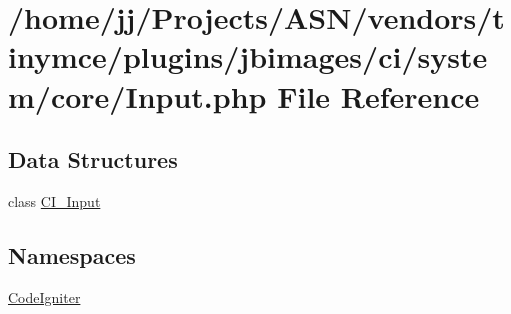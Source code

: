 \hypertarget{_input_8php}{}\section{/home/jj/\+Projects/\+A\+S\+N/vendors/tinymce/plugins/jbimages/ci/system/core/\+Input.php File Reference}
\label{_input_8php}
\subsection*{Data Structures}
\begin{DoxyCompactItemize}
\item 
class \hyperlink{class_c_i___input}{C\+I\+\_\+\+Input}
\end{DoxyCompactItemize}
\subsection*{Namespaces}
\begin{DoxyCompactItemize}
\item 
 \hyperlink{namespace_code_igniter}{Code\+Igniter}
\end{DoxyCompactItemize}
